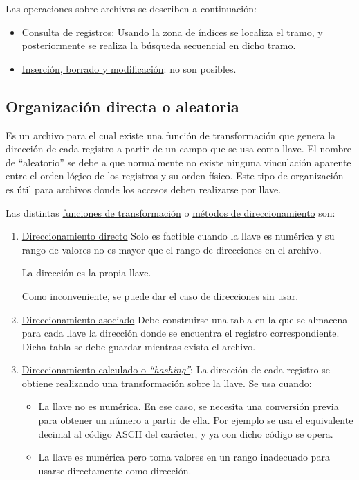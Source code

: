 Las operaciones sobre archivos se describen a continuación:
\begin{itemize}
    \item \underline{Consulta de registros}: Usando la zona de índices se localiza el tramo, y posteriormente se realiza la búsqueda secuencial en dicho tramo.
    \item \underline{Inserción, borrado y modificación}: no son posibles.
\end{itemize}


\subsection{Organización directa o aleatoria}
Es un archivo para el cual existe una función de transformación que genera la dirección de cada registro a partir de un campo que se usa como llave. El nombre de ``aleatorio'' se debe a que normalmente no existe ninguna vinculación aparente entre el orden lógico de los registros y su orden físico. Este tipo de organización es útil para archivos donde los accesos deben realizarse por llave.

Las distintas \underline{funciones de transformación} o \underline{métodos de direccionamiento} son:
\begin{enumerate}
    \item \underline{Direccionamiento directo} Solo es factible cuando la llave es numérica y su rango de valores no es mayor que el rango de direcciones en el archivo.

    La dirección es la propia llave.

    Como inconveniente, se puede dar el caso de direcciones sin usar.

    \item \underline{Direccionamiento asociado} Debe construirse una tabla en la que se almacena para cada llave la dirección donde se encuentra el registro correspondiente. Dicha tabla se debe guardar mientras exista el archivo.

    \item \underline{Direccionamiento calculado o \textit{``hashing''}}:
    La dirección de cada registro se obtiene realizando una transformación sobre la llave. Se usa cuando:
    \begin{itemize}
        \item La llave no es numérica. En ese caso, se necesita una conversión previa para obtener un número a partir de ella. Por ejemplo se usa el equivalente decimal al código ASCII del carácter, y ya con dicho código se opera.

        \item La llave es numérica pero toma valores en un rango inadecuado para usarse directamente como dirección.
    \end{itemize}
\end{enumerate}


